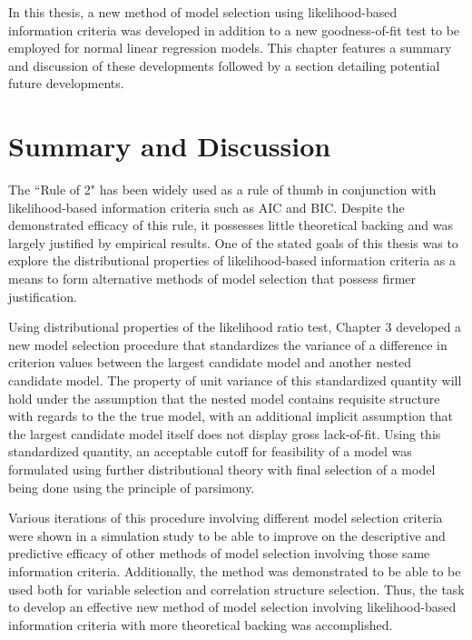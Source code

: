 \doublespace
{}

		In this thesis, a new method of model selection using likelihood-based information criteria was developed in addition to a new goodness-of-fit test
		to be employed for normal linear regression models. This chapter features a summary and discussion of these developments followed by a section
		detailing potential future developments. 

		\section{Summary and Discussion}

		The ``Rule of 2" has been widely used as a rule of thumb in conjunction with likelihood-based information criteria such as AIC and BIC. Despite the
		demonstrated efficacy of this rule, it possesses little theoretical backing and was largely justified by empirical results. One of the stated
		goals of this thesis was to explore the distributional properties of likelihood-based information criteria as a means to form alternative methods of
		model selection that possess firmer justification.
		
		Using distributional properties of the likelihood ratio test, Chapter 3 developed a new model selection procedure that standardizes the variance of
		a difference in criterion values between the largest candidate model and another nested candidate model. The property of unit variance of this
		standardized quantity will hold under the assumption that the nested model contains requisite structure with regards to the the true model, with an additional
		implicit assumption that the largest candidate model itself does not display gross lack-of-fit. Using this standardized quantity, an acceptable
		cutoff for feasibility of a model was formulated using further distributional theory with final selection of a model being done using the principle
		of parsimony.

		Various iterations of this procedure involving different model selection criteria were shown in a simulation study to be able to improve on the descriptive
		and predictive efficacy of other methods of model selection involving those same information criteria.  Additionally, the method was demonstrated to
		be able to be used both for variable selection and correlation structure selection. Thus, the task to develop an effective new method of model selection
		involving likelihood-based information criteria with more theoretical backing was accomplished.

